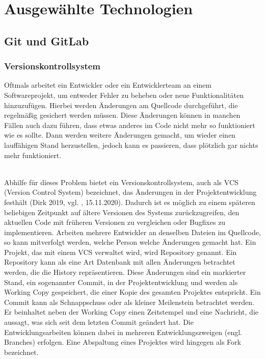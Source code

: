 \chapter{Ausgewählte Technologien}

\section{Git und GitLab}

\subsection{Versionskontrollsystem}
Oftmals arbeitet ein Entwickler oder ein Entwicklerteam an einem Softwareprojekt, um entweder Fehler zu beheben oder neue Funktionalitäten hinzuzufügen. Hierbei werden Änderungen am Quellcode durchgeführt, die regelmäßig gesichert werden müssen. Diese Änderungen können in manchen Fällen auch dazu führen, dass etwas anderes im Code nicht mehr so funktioniert wie es sollte. Dann werden weitere Änderungen gemacht, um wieder einen lauffähigen Stand herzustellen, jedoch kann es passieren, dass plötzlich gar nichts mehr funktioniert.

\mbox{}\\Abhilfe für dieses Problem bietet ein Versionskontrollsystem, auch als VCS (Version Control System) bezeichnet, das Änderungen in der Projektentwicklung festhält (Dirk 2019, vgl. \cite{vcs_2019}, 15.11.2020). Dadurch ist es möglich zu einem späteren beliebigen Zeitpunkt auf ältere Versionen des Systems zurückzugreifen, den aktuellen Code mit früheren Versionen zu vergleichen oder Bugfixes zu implementieren. Arbeiten mehrere Entwickler an denselben Dateien im Quellcode, so kann mitverfolgt werden, welche Person welche Änderungen gemacht hat. Ein Projekt, das mit einem VCS verwaltet wird, wird Repository genannt. Ein Repository kann als eine Art Datenbank mit allen Änderungen betrachtet werden, die die History repräsentieren. Diese Änderungen sind ein markierter Stand, ein sogenannter Commit, in der Projektentwicklung und werden als Working Copy gespeichert, die einer Kopie des gesamten Projektes entspricht. Ein Commit kann als Schnappschuss oder als kleiner Meilenstein betrachtet werden. Er beinhaltet neben der Working Copy einen Zeitstempel und eine Nachricht, die aussagt, was sich seit dem letzten Commit geändert hat. Die Entwicklungsarbeiten können dabei in mehreren Entwicklungszweigen (engl. Branches) erfolgen. Eine Abspaltung eines Projektes wird hingegen als Fork bezeichnet.

